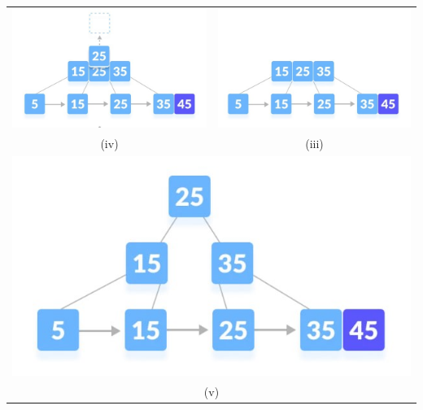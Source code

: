 \documentclass{article}
\begin{document}
        \begin{center}
        \pagebreak    
        \end{center}
        \begin{table}[ht]
            \centering
            \begin{tabular}{c c}
                    \includegraphics[scale=0.7]{Images/bi5_2_2.jpg} &\includegraphics[scale=0.7]{Images/bi5_2_1.jpg}\\
                ({\color{red}iv}) &({\color{red}iii}) \\
                    \multicolumn{2}{c}{\includegraphics[scale=0.7]{Images/bi5_3.jpg}}\\
                \multicolumn{2}{c}{({\color{red}v})}\\
            \end{tabular}
        \end{table}  
 
\end{document}
